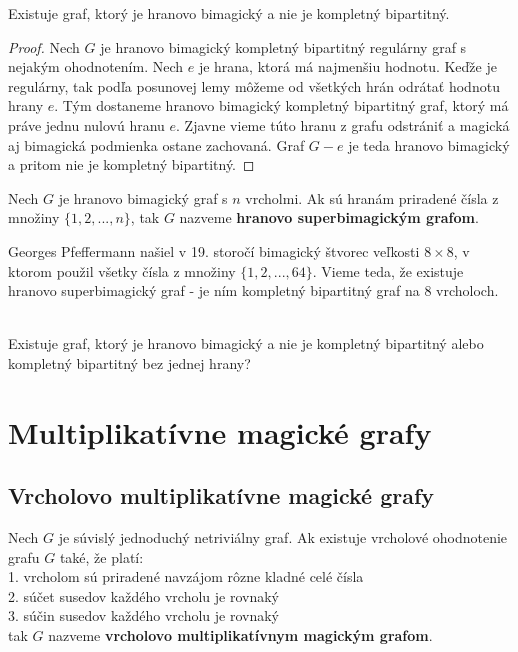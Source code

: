 \begin{subtheorem} Existuje graf, ktorý je hranovo bimagický a nie je kompletný bipartitný.
\end{subtheorem}

\begin{proof} Nech $G$ je hranovo bimagický kompletný bipartitný regulárny graf s nejakým ohodnotením. Nech $e$ je hrana, ktorá má najmenšiu hodnotu. Keďže je regulárny, tak podľa posunovej lemy môžeme od všetkých hrán odrátať hodnotu hrany $e$. Tým dostaneme hranovo bimagický kompletný bipartitný graf, ktorý má práve jednu nulovú hranu $e$. Zjavne vieme túto hranu z grafu odstrániť a magická aj bimagická podmienka ostane zachovaná. Graf $G - e$ je teda hranovo bimagický a pritom nie je kompletný bipartitný.
\end{proof}

\begin{subdefinition} Nech $G$ je hranovo bimagický graf s $n$ vrcholmi. Ak sú hranám priradené čísla z množiny $\{1, 2, ... , n\}$, tak $G$ nazveme \textbf{hranovo superbimagickým grafom}.
\end{subdefinition} 

Georges Pfeffermann našiel v 19. storočí bimagický štvorec veľkosti $8 \times 8$, v ktorom použil všetky čísla z množiny $\{1, 2, ... , 64\}$. Vieme teda, že existuje hranovo superbimagický graf - je ním kompletný bipartitný graf na $8$ vrcholoch. \\\\

\begin{subhypothesis} Existuje graf, ktorý je hranovo bimagický a nie je kompletný bipartitný alebo kompletný bipartitný bez jednej hrany?
\end{subhypothesis} 



\section{Multiplikatívne magické grafy}

\subsection{Vrcholovo multiplikatívne magické grafy}

\begin{subdefinition} Nech $G$ je súvislý jednoduchý netriviálny graf. Ak existuje vrcholové ohodnotenie grafu $G$ také, že platí: \\
1. vrcholom sú priradené navzájom rôzne kladné celé čísla \\
2. súčet susedov každého vrcholu je rovnaký \\
3. súčin susedov každého vrcholu je rovnaký \\
tak $G$ nazveme \textbf{vrcholovo multiplikatívnym magickým grafom}.
\end{subdefinition} 

